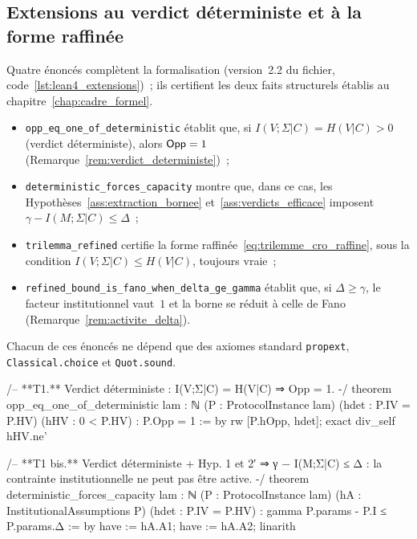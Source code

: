 \subsection{Extensions au verdict d\'eterministe et \`a la forme raffin\'ee}
\label{subsec:lean4_extensions}
\begin{sloppypar}
Quatre \'enonc\'es compl\`etent la formalisation (version~2.2 du fichier,
code~\ref{lst:lean4_extensions})~; ils certifient les deux faits
structurels \'etablis au chapitre~\ref{chap:cadre_formel}.
\begin{itemize}
\item \texttt{opp\_eq\_one\_of\_deterministic} \'etablit que, si $I(V;\Sigma|C) = H(V|C) > 0$
      (verdict d\'eterministe), alors $\mathsf{Opp} = 1$
      (Remarque~\ref{rem:verdict_deterministe})~;
\item \texttt{deterministic\_forces\_capacity} montre que, dans ce cas, les
      Hypoth\`eses~\ref{ass:extraction_bornee} et~\ref{ass:verdicts_efficace} imposent $\gamma - I(M;\Sigma|C) \leq \Delta$~;
\item \texttt{trilemma\_refined} certifie la forme raffin\'ee~\eqref{eq:trilemme_cro_raffine},
      sous la condition $I(V;\Sigma|C) \leq H(V|C)$, toujours vraie~;
\item \texttt{refined\_bound\_is\_fano\_when\_delta\_ge\_gamma} \'etablit que, si
      $\Delta \geq \gamma$, le facteur institutionnel vaut~$1$ et la borne se
      r\'eduit \`a celle de Fano (Remarque~\ref{rem:activite_delta}).
\end{itemize}
Chacun de ces \'enonc\'es ne d\'epend que des axiomes standard \texttt{propext},
\texttt{Classical.choice} et \texttt{Quot.sound}.

\begin{leancode}[caption={Extensions introduites en version 2.2}, label={lst:lean4_extensions}]
/-- **T1.** Verdict déterministe : I(V;Σ|C) = H(V|C) ⇒ Opp = 1. -/
theorem opp_eq_one_of_deterministic {lam : ℕ} (P : ProtocolInstance lam)
    (hdet : P.IV = P.HV) (hHV : 0 < P.HV) : P.Opp = 1 := by
  rw [P.hOpp, hdet]; exact div_self hHV.ne'

/-- **T1 bis.** Verdict déterministe + Hyp. 1 et 2′ ⇒ γ − I(M;Σ|C) ≤ Δ :
    la contrainte institutionnelle ne peut pas être active. -/
theorem deterministic_forces_capacity {lam : ℕ} (P : ProtocolInstance lam)
    (hA : InstitutionalAssumptions P) (hdet : P.IV = P.HV) :
    gamma P.params - P.I ≤ P.params.Δ := by
  have := hA.A1; have := hA.A2; linarith


\end{leancode}
\end{sloppypar}

